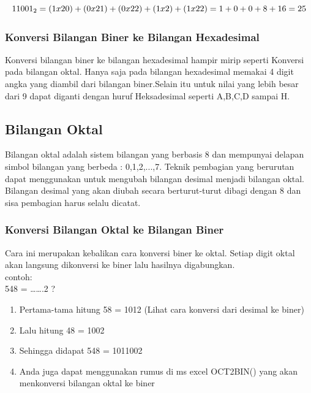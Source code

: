 \begin{equation}
11001_{2} = (1x20)+(0x21)+(0x22)+(1x2)+(1x22) \\
= 1+0+0+8+16 
= 25
\end{equation}

\subsubsection{Konversi Bilangan Biner ke Bilangan Hexadesimal}
Konversi bilangan biner ke bilangan hexadesimal hampir mirip seperti Konversi pada bilangan oktal. Hanya saja pada bilangan hexadesimal memakai 4 digit angka yang diambil dari bilangan biner.Selain itu untuk nilai yang lebih besar dari 9 dapat diganti dengan huruf Heksadesimal seperti A,B,C,D sampai H. 
\subsection{Bilangan Oktal}
Bilangan oktal adalah sistem bilangan yang berbasis 8 dan mempunyai delapan simbol bilangan yang berbeda : 0,1,2,...,7.
Teknik pembagian yang berurutan dapat menggunakan untuk mengubah bilangan desimal menjadi bilangan oktal. Bilangan desimal yang akan diubah secara berturut-turut dibagi dengan 8 dan sisa pembagian harus selalu dicatat. 
\subsubsection{Konversi Bilangan Oktal ke Bilangan Biner}
Cara ini merupakan kebalikan cara konversi biner ke oktal. Setiap digit oktal akan langsung dikonversi ke biner lalu hasilnya digabungkan.
\\contoh:
\\548 = …….2 ?
\\
\begin{enumerate}
\item Pertama-tama hitung 58 = 1012 (Lihat cara konversi dari desimal ke biner)
\item Lalu hitung 48 = 1002
\item Sehingga didapat 548 = 1011002
\item Anda juga dapat menggunakan rumus di ms excel OCT2BIN() yang akan menkonversi bilangan oktal ke biner
\end{enumerate}

